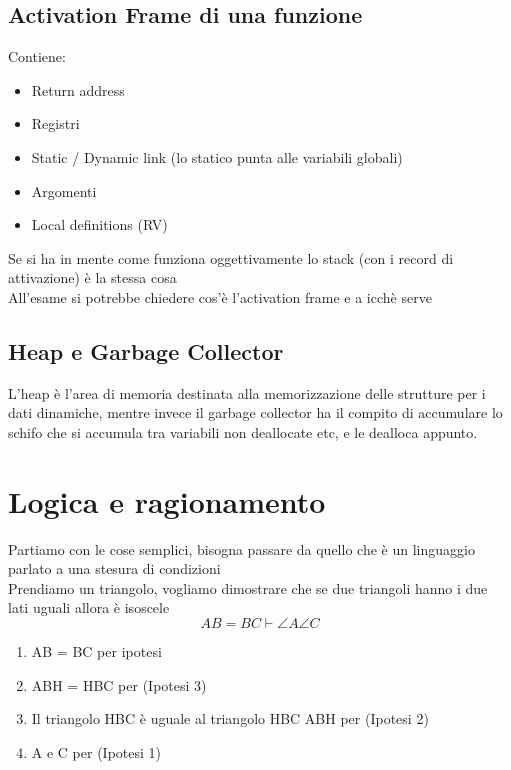 \documentclass[12pt, a4paper, openany, oneside]{book}
\begin{document}
\section{Activation Frame di una funzione}
Contiene:
\begin{itemize}
	\item Return address
	\item Registri
	\item Static / Dynamic link (lo statico punta alle variabili globali)
	\item Argomenti
	\item Local definitions (RV)
\end{itemize}
Se si ha in mente come funziona oggettivamente lo stack (con i record di
attivazione) è la stessa cosa \\
All'esame si potrebbe chiedere cos'è l'activation frame e a icchè serve
\section{Heap e Garbage Collector}
L'heap è l'area di memoria destinata alla memorizzazione delle strutture per i
dati dinamiche, mentre invece il garbage collector ha il compito di accumulare
lo schifo che si accumula tra variabili non deallocate etc, e le dealloca 
appunto.
\chapter{Logica e ragionamento}
Partiamo con le cose semplici, bisogna passare da quello che è un linguaggio 
parlato a una stesura di condizioni \\
Prendiamo un triangolo, vogliamo dimostrare che se due triangoli hanno i due
lati uguali allora è isoscele \\
\[AB = BC \vdash \angle A \angle C\]
\begin{enumerate}
	\item AB = BC per ipotesi
	\item ABH = HBC per (Ipotesi 3)
	\item Il triangolo HBC è uguale al triangolo HBC ABH per (Ipotesi 2)
	\item A e C per (Ipotesi 1)
\end{enumerate}
\end{document}

